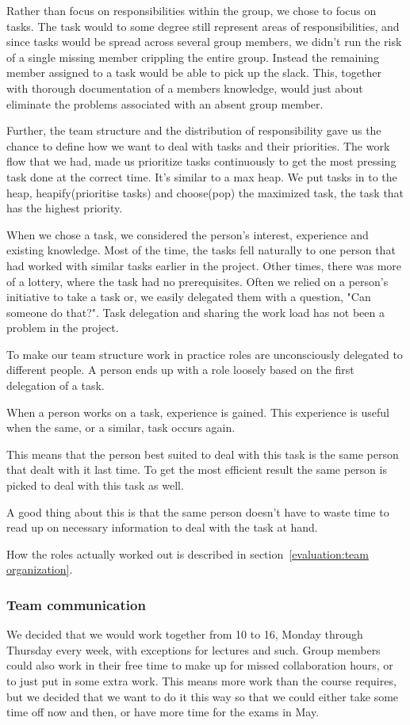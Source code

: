     Rather than focus on responsibilities within the group, we chose to focus on tasks. The task would to some degree still represent areas of responsibilities, and since tasks would be spread across several group members, we didn't run the risk of a single missing member crippling the entire group. Instead the remaining member assigned to a task would be able to pick up the slack. This, together with thorough documentation of a members knowledge, would just about eliminate the problems associated with an absent group member.
        
    Further, the team structure and the distribution of responsibility gave us the chance to define how we want to deal with tasks and their priorities. The work flow that we had, made us prioritize tasks continuously to get the most pressing task done at the correct time. It's similar to a max heap. We put tasks in to the heap, heapify(prioritise tasks) and choose(pop) the maximized task, the task that has the highest priority. 
    
    When we chose a task, we considered the person's interest, experience and existing knowledge. Most of the time, the tasks fell naturally to one person that had worked with similar tasks earlier in the project. Other times, there was more of a lottery, where the task had no prerequisites. Often we relied on a person's initiative to take a task or, we easily delegated them with a question, "Can someone do that?". Task delegation and sharing the work load has not been a problem in the project.
    
    To make our team structure work in practice roles are unconsciously delegated to different people. A person ends up with a role loosely based on the first delegation of a task. 
    
    When a person works on a task, experience is gained. This experience is useful when the same, or a similar, task occurs again. 
    
    This means that the person best suited to deal with this task is the same person that dealt with it last time. To get the most efficient result the same person is picked to deal with this task as well. 

    A good thing about this is that the same person doesn't have to waste time to read up on necessary information to deal with the task at hand.  
    
    How the roles actually worked out is described in section~\ref{evaluation:team organization}.
    
    \subsubsection{Team communication}\label{Team communication}
    We decided that we would work together from 10 to 16, Monday through Thursday every week, with exceptions for lectures and such. Group members could also work in their free time to make up for missed collaboration hours, or to just put in some extra work. This means more work than the course requires, but we decided that we want to do it this way so that we could either take some time off now and then, or have more time for the exams in May.

